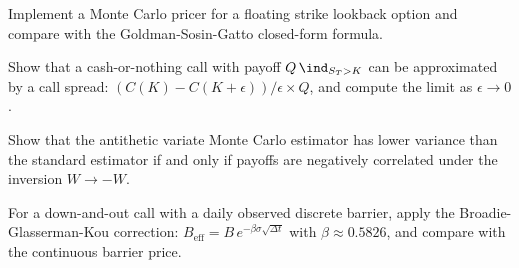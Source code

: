 \begin{exercise}
Implement a Monte Carlo pricer for a floating strike lookback option and
compare with the Goldman-Sosin-Gatto closed-form formula.
\end{exercise}

\begin{exercise}
Show that a cash-or-nothing call with payoff $Q\,\ind_{S_T > K}$ can be
approximated by a call spread: $(C(K) - C(K + \epsilon))/\epsilon \times Q$,
and compute the limit as $\epsilon \to 0$.
\end{exercise}

\begin{exercise}
Show that the antithetic variate Monte Carlo estimator has lower variance
than the standard estimator if and only if payoffs are negatively correlated
under the inversion $W \to -W$.
\end{exercise}

\begin{exercise}
For a down-and-out call with a daily observed discrete barrier, apply the
Broadie-Glasserman-Kou correction:
$B_{\mathrm{eff}} = B\,e^{-\beta\sigma\sqrt{\Delta t}}$ with
$\beta \approx 0.5826$, and compare with the continuous barrier price.
\end{exercise}
